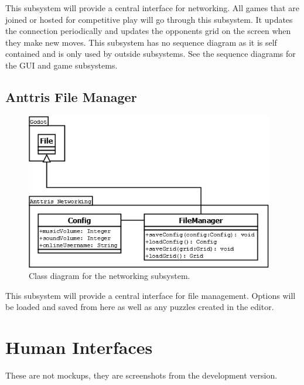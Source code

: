 \documentclass[12pt]{article}
\begin{document}
This subsystem will provide a central interface for networking. All games that are joined or hosted for competitive play will go through this subsystem. It updates the connection periodically and updates the opponents grid on the screen when they make new moves. This subsystem has no sequence diagram as it is self contained and is only used by outside subsystems. See the sequence diagrams for the GUI and game subsystems.

\subsection{Anttris File Manager} %
    \begin{figure}[H]
        \centering
        \includegraphics[width=4.27in]{Anttris_FileClass.png}
        \caption{Class diagram for the networking subsystem.}
    \end{figure}

This subsystem will provide a central interface for file management. Options will be loaded and saved from here as well as any puzzles created in the editor.
\section{Human Interfaces} %
These are not mockups, they are screenshots from the development version.
\end{document}
